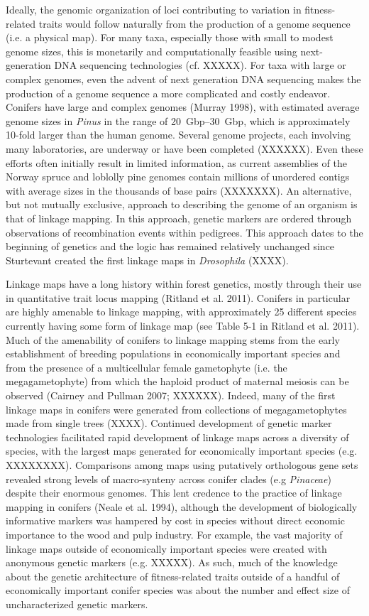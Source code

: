 \documentclass[11pt]{article}
\begin{document}
Ideally, the genomic organization of loci contributing to variation in fitness-related traits would 
follow naturally from the production of a genome sequence (i.e. a physical map). For many taxa, especially those 
with small to modest genome sizes,
this is monetarily and computationally feasible using next-generation DNA sequencing technologies (cf. XXXXX). For taxa with large or complex
genomes, even the advent of next generation DNA sequencing makes the production of a genome sequence 
a more complicated and costly endeavor. Conifers have large and complex genomes (Murray 1998), with estimated average genome sizes in \textit{Pinus} in the range of \SIrange{20}{30}{Gbp},
which is approximately 10-fold larger than the human genome. 
Several genome projects, each involving many laboratories, are
underway or have been completed (XXXXXX). Even these efforts often initially 
result in limited information, as current assemblies of the Norway spruce and
loblolly pine genomes contain millions of unordered contigs with average sizes in the thousands of base pairs (XXXXXXX). An alternative, 
but not mutually exclusive, approach to describing the genome of an
organism is that of linkage mapping. In this approach, genetic markers are ordered through 
observations of recombination events within pedigrees. This approach
dates to the beginning of genetics and the logic has remained relatively unchanged since 
Sturtevant created the first linkage maps in \textit{Drosophila} (XXXX). 

Linkage maps have a long history within forest genetics, mostly through their use in quantitative trait locus
mapping (Ritland et al. 2011). Conifers in particular are highly amenable to linkage mapping, with approximately
25 different species currently having some form of linkage map (see Table 5-1 in Ritland et al. 2011). Much of the amenability of
conifers to linkage mapping stems from the early establishment of breeding populations in economically important species and from the presence of a 
multicellular female gametophyte (i.e. the megagametophyte) from which the haploid product of maternal meiosis can be observed (Cairney and Pullman 2007;
XXXXXX). Indeed, many of the first linkage maps in conifers were generated from collections of megagametophytes made from single trees (XXXX).
Continued development of genetic marker technologies facilitated rapid development of linkage maps across a diversity of species, with 
the largest maps generated for economically important species (e.g. XXXXXXXX). Comparisons among maps using putatively orthologous gene
sets revealed strong levels of macro-synteny across conifer clades (e.g \textit{Pinaceae}) despite their enormous genomes. This lent credence to 
the practice of linkage mapping in conifers (Neale et al. 1994), although the development of biologically informative markers was hampered by cost in species without direct 
economic importance to the wood and pulp industry. For example, the vast majority of linkage maps outside of economically important species were
created with anonymous genetic markers (e.g. XXXXX). As such, much of the knowledge about the genetic architecture of fitness-related traits outside of a
handful of economically important conifer species was about the number and effect size of uncharacterized genetic markers.
\end{document}
